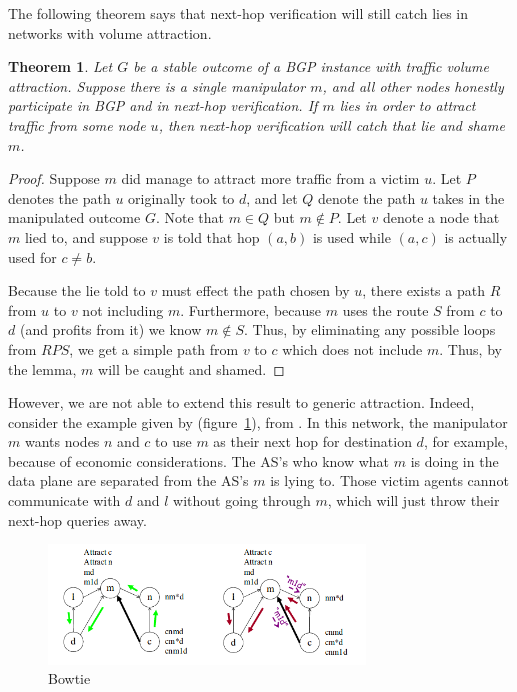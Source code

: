 \documentclass[10pt]{article}
\newtheorem{theorem}{Theorem}
\begin{document}
  The following theorem says that next-hop verification will still catch lies
  in networks with volume attraction.
  \begin{theorem}
    Let $G$ be a stable outcome of a BGP instance with traffic volume attraction.
    Suppose there is a single manipulator $m$,
    and all other nodes honestly participate in BGP and in next-hop verification.
    If $m$ lies in order to attract traffic from some node $u$,
    then next-hop verification will catch that lie and shame $m$.
  \end{theorem}
  \begin{proof}
    Suppose $m$ did manage to attract more traffic from a victim $u$.
    Let $P$ denotes the path $u$ originally took to $d$,
    and let $Q$ denote the path $u$ takes in the manipulated outcome $G$.
    Note that $m\in Q$ but $m\notin P$.
    Let $v$ denote a node that $m$ lied to, and suppose $v$ is told
    that hop $(a,b)$ is used while $(a,c)$ is actually used for $c\ne b$.

    Because the lie told to $v$ must effect the path chosen by $u$,
    there exists a path $R$ from $u$ to $v$ not including $m$.
    Furthermore, because $m$ uses the route $S$ from $c$ to $d$
    (and profits from it) we know $m\notin S$.
    Thus, by eliminating any possible loops from $RPS$,
    we get a simple path from $v$ to $c$ which does not include $m$.
    Thus, by the lemma, $m$ will be caught and shamed.
  \end{proof}

  However, we are not able to extend this result to generic attraction.
  Indeed, consider the example given by (figure~\ref{fig:Bowtie}),
  from \cite{Attraction}.
  In this network, the manipulator $m$ wants nodes $n$ and $c$
  to use $m$ as their next hop for destination $d$,
  for example, because of economic considerations.
  The AS's who know what $m$ is doing in the data plane
  are separated from the AS's $m$ is lying to.
  Those victim agents cannot communicate with $d$ and $l$ without
  going through $m$, which will just throw their next-hop queries away.
  \begin{figure}[h]
    \centering
    \caption{Bowtie}\label{fig:Bowtie}
    \includegraphics[width=0.75\textwidth]{Bowtie}
  \end{figure}
\end{document}
